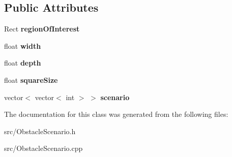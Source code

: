 \subsection*{Public Attributes}
\begin{DoxyCompactItemize}
\item 
Rect {\bfseries region\+Of\+Interest}\hypertarget{class_obstacle_scenario_ade67375b9fa9cf4708643661fb1e39a3}{}\label{class_obstacle_scenario_ade67375b9fa9cf4708643661fb1e39a3}

\item 
float {\bfseries width}\hypertarget{class_obstacle_scenario_a5cbdca0b5c666356b30d75168e2ef1bb}{}\label{class_obstacle_scenario_a5cbdca0b5c666356b30d75168e2ef1bb}

\item 
float {\bfseries depth}\hypertarget{class_obstacle_scenario_a3d609433674b0cc41dd34030951fa06a}{}\label{class_obstacle_scenario_a3d609433674b0cc41dd34030951fa06a}

\item 
float {\bfseries square\+Size}\hypertarget{class_obstacle_scenario_afb885aad506040df04a661cfa346ec23}{}\label{class_obstacle_scenario_afb885aad506040df04a661cfa346ec23}

\item 
vector$<$ vector$<$ int $>$ $>$ {\bfseries scenario}\hypertarget{class_obstacle_scenario_a7d4eede16d2e2a45f16d12523598f7aa}{}\label{class_obstacle_scenario_a7d4eede16d2e2a45f16d12523598f7aa}

\end{DoxyCompactItemize}


The documentation for this class was generated from the following files\+:\begin{DoxyCompactItemize}
\item 
src/Obstacle\+Scenario.\+h\item 
src/Obstacle\+Scenario.\+cpp\end{DoxyCompactItemize}
